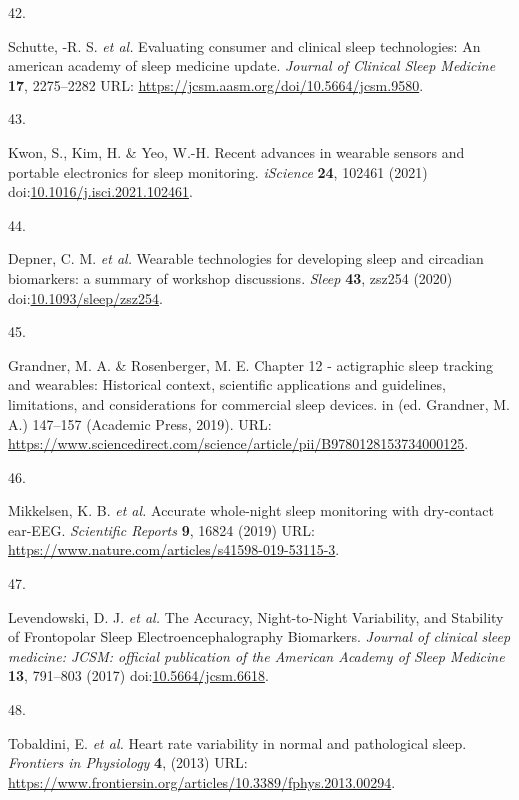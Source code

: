 \documentclass[
  9pt,
]{scrbook}
\newlength{\cslhangindent}
\newlength{\csllabelwidth}
\newlength{\cslentryspacingunit} %
\newenvironment{CSLReferences}[2] %
 {%
  \setlength{\parindent}{0pt}
  \ifodd #1
  \let\oldpar\par
  \def\par{\hangindent=\cslhangindent\oldpar}
  \fi
  \setlength{\parskip}{#2\cslentryspacingunit}
 }%
 {}
\newcommand{\CSLLeftMargin}[1]{\parbox[t]{\csllabelwidth}{#1}}
\newcommand{\CSLRightInline}[1]{\parbox[t]{\linewidth - \csllabelwidth}{#1}\break}
\begin{document}
\begin{CSLReferences}{0}{0}
\leavevmode{}%
\CSLLeftMargin{42. }%
\CSLRightInline{Schutte, -R. S. \emph{et al.} Evaluating consumer and
clinical sleep technologies: An american academy of sleep medicine
update. \emph{Journal of Clinical Sleep Medicine} \textbf{17},
2275--2282 URL: \url{https://jcsm.aasm.org/doi/10.5664/jcsm.9580}.}

\leavevmode{}%
\CSLLeftMargin{43. }%
\CSLRightInline{Kwon, S., Kim, H. \& Yeo, W.-H. Recent advances in
wearable sensors and portable electronics for sleep monitoring.
\emph{iScience} \textbf{24}, 102461 (2021)
doi:\href{https://doi.org/10.1016/j.isci.2021.102461}{10.1016/j.isci.2021.102461}.}

\leavevmode{}%
\CSLLeftMargin{44. }%
\CSLRightInline{Depner, C. M. \emph{et al.} Wearable technologies for
developing sleep and circadian biomarkers: a summary of workshop
discussions. \emph{Sleep} \textbf{43}, zsz254 (2020)
doi:\href{https://doi.org/10.1093/sleep/zsz254}{10.1093/sleep/zsz254}.}

\leavevmode{}%
\CSLLeftMargin{45. }%
\CSLRightInline{Grandner, M. A. \& Rosenberger, M. E. Chapter 12 -
actigraphic sleep tracking and wearables: Historical context, scientific
applications and guidelines, limitations, and considerations for
commercial sleep devices. in (ed. Grandner, M. A.) 147--157 (Academic
Press, 2019). URL:
\url{https://www.sciencedirect.com/science/article/pii/B9780128153734000125}.}

\leavevmode{}%
\CSLLeftMargin{46. }%
\CSLRightInline{Mikkelsen, K. B. \emph{et al.} Accurate whole-night
sleep monitoring with dry-contact ear-EEG. \emph{Scientific Reports}
\textbf{9}, 16824 (2019) URL:
\url{https://www.nature.com/articles/s41598-019-53115-3}.}

\leavevmode{}%
\CSLLeftMargin{47. }%
\CSLRightInline{Levendowski, D. J. \emph{et al.} The Accuracy,
Night-to-Night Variability, and Stability of Frontopolar Sleep
Electroencephalography Biomarkers. \emph{Journal of clinical sleep
medicine: JCSM: official publication of the American Academy of Sleep
Medicine} \textbf{13}, 791--803 (2017)
doi:\href{https://doi.org/10.5664/jcsm.6618}{10.5664/jcsm.6618}.}

\leavevmode{}%
\CSLLeftMargin{48. }%
\CSLRightInline{Tobaldini, E. \emph{et al.} Heart rate variability in
normal and pathological sleep. \emph{Frontiers in Physiology}
\textbf{4}, (2013) URL:
\url{https://www.frontiersin.org/articles/10.3389/fphys.2013.00294}.}


\end{CSLReferences}
\end{document}
